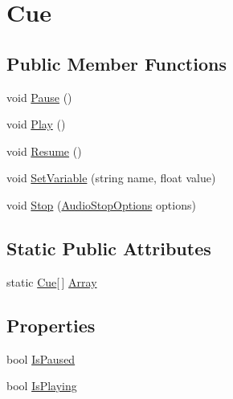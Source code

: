 \hypertarget{classMicrosoft_1_1Xna_1_1Framework_1_1Audio_1_1Cue}{}\section{Cue}
\label{classMicrosoft_1_1Xna_1_1Framework_1_1Audio_1_1Cue}
\subsection*{Public Member Functions}
\begin{DoxyCompactItemize}
\item 
void \hyperlink{classMicrosoft_1_1Xna_1_1Framework_1_1Audio_1_1Cue_a70babc5227ddd16ca31dccc6cec0bb22}{Pause} ()
\item 
void \hyperlink{classMicrosoft_1_1Xna_1_1Framework_1_1Audio_1_1Cue_a12574569144fb9d22d996965ee42b627}{Play} ()
\item 
void \hyperlink{classMicrosoft_1_1Xna_1_1Framework_1_1Audio_1_1Cue_a8af8fb637c7ae9d71a23bf3ac80d3c86}{Resume} ()
\item 
void \hyperlink{classMicrosoft_1_1Xna_1_1Framework_1_1Audio_1_1Cue_a974f96eab58d3d33d000b8f287fc949b}{Set\+Variable} (string name, float value)
\item 
void \hyperlink{classMicrosoft_1_1Xna_1_1Framework_1_1Audio_1_1Cue_aab4bb7ba8b7206df5563593d31027001}{Stop} (\hyperlink{namespaceMicrosoft_1_1Xna_1_1Framework_1_1Audio_a8971953d3b31e62db241f81984a5433f}{Audio\+Stop\+Options} options)
\end{DoxyCompactItemize}
\subsection*{Static Public Attributes}
\begin{DoxyCompactItemize}
\item 
static \hyperlink{classMicrosoft_1_1Xna_1_1Framework_1_1Audio_1_1Cue}{Cue}\mbox{[}$\,$\mbox{]} \hyperlink{classMicrosoft_1_1Xna_1_1Framework_1_1Audio_1_1Cue_a5c55bdfb307767bf201cc0b0fdae888a}{Array}
\end{DoxyCompactItemize}
\subsection*{Properties}
\begin{DoxyCompactItemize}
\item 
bool \hyperlink{classMicrosoft_1_1Xna_1_1Framework_1_1Audio_1_1Cue_af0cfdad2000f6666b74f837342ede53d}{Is\+Paused}
\item 
bool \hyperlink{classMicrosoft_1_1Xna_1_1Framework_1_1Audio_1_1Cue_aa3a66cc799248a4384240e006bb9ef1d}{Is\+Playing}
\end{DoxyCompactItemize}


